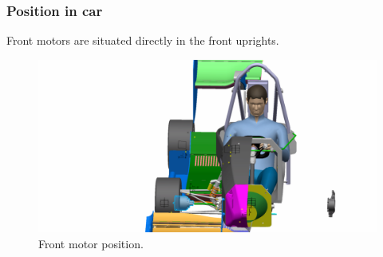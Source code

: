 \subsubsection{Position in car}
Front motors are situated directly in the front uprights.

\begin{figure}[H]
	\centering
	\includegraphics[width=\textwidth]{./img/Motor-front-position.jpg}
	\caption{Front motor position.}
	\label{fig:Motor-front-position}
\end{figure}


